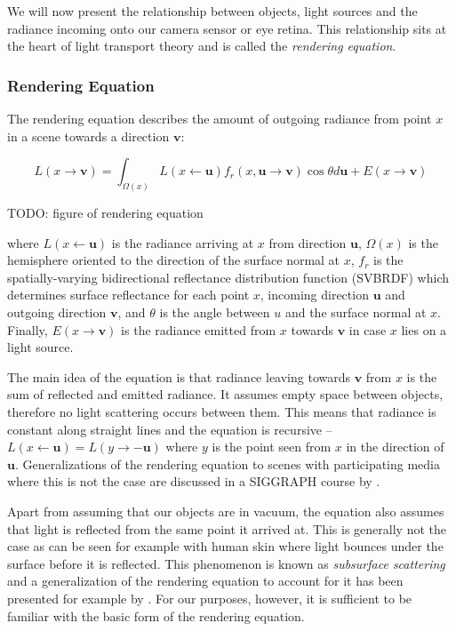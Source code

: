 We will now present the relationship between objects, light sources and the radiance incoming onto our camera sensor or eye retina. This relationship sits at the heart of light transport theory and is called the \textit{rendering equation}.

\subsubsection{Rendering Equation}
\label{section:background-projection_mapping-light_transport-rendering_equation}

The rendering equation describes the amount of outgoing radiance from point \(x\) in a scene towards a direction \(\mathbf{v}\):

\begin{equation}
    \label{eq:rendering_equation}
    L(x \rightarrow \mathbf{v}) = \int_{\Omega(x)} L(x \leftarrow \mathbf{u}) f_r(x, \mathbf{u} \rightarrow \mathbf{v}) \cos \theta d\mathbf{u} + E(x \rightarrow \mathbf{v})
\end{equation}

{\color{red} TODO: figure of rendering equation}

where \(L(x \leftarrow \mathbf{u})\) is the radiance arriving at \(x\) from direction \(\mathbf{u}\), \(\Omega(x)\) is the hemisphere oriented to the direction of the surface normal at \(x\), \(f_r\) is the spatially-varying bidirectional reflectance distribution function (SVBRDF) which determines surface reflectance for each point \(x\), incoming direction \(\mathbf{u}\) and outgoing direction \(\mathbf{v}\), and \(\theta\) is the angle between \(u\) and the surface normal at \(x\). Finally, \(E(x \rightarrow \mathbf{v})\) is the radiance emitted from \(x\) towards \(\mathbf{v}\) in case \(x\) lies on a light source.

The main idea of the equation is that radiance leaving towards \(\mathbf{v}\) from \(x\) is the sum of reflected and emitted radiance. It assumes empty space between objects, therefore no light scattering occurs between them. This means that radiance is constant along straight lines and the equation is recursive -- \(L(x \leftarrow \mathbf{u}) = L(y \rightarrow -\mathbf{u})\) where \(y\) is the point seen from \(x\) in the direction of \(\mathbf{u}\). Generalizations of the rendering equation to scenes with participating media where this is not the case are discussed in a SIGGRAPH course by \citet{Novak2018}.

Apart from assuming that our objects are in vacuum, the equation also assumes that light is reflected from the same point it arrived at. This is generally not the case as can be seen for example with human skin where light bounces under the surface before it is reflected. This phenomenon is known as \textit{subsurface scattering} and a generalization of the rendering equation to account for it has been presented for example by \citet{Jensen2001}. For our purposes, however, it is sufficient to be familiar with the basic form of the rendering equation.

